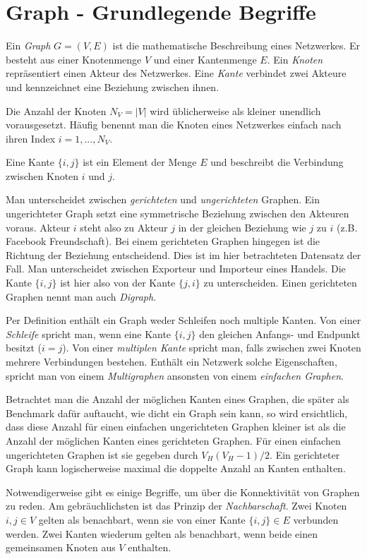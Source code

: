 \documentclass[a4paper,ngerman,oneside,titlepage,bibliography=totoc,11pt]{scrreprt}
\begin{document}
\section{Graph - Grundlegende Begriffe}

Ein \emph{Graph} $G = (V,E)$ ist die mathematische Beschreibung eines Netzwerkes. Er besteht aus einer Knotenmenge $V$ und einer Kantenmenge $E$. Ein \emph{Knoten} repräsentiert einen Akteur des Netzwerkes. Eine \emph{Kante} verbindet zwei Akteure und kennzeichnet eine Beziehung zwischen ihnen.

Die Anzahl der Knoten $N_V = |V|$ wird üblicherweise als kleiner unendlich vorausgesetzt. Häufig benennt man die Knoten eines Netzwerkes einfach nach ihren Index $i = 1, ..., N_V$.

Eine Kante $\{i,j\}$ ist ein Element der Menge $E$ und  beschreibt die Verbindung zwischen Knoten $i$ und $j$.

Man unterscheidet zwischen \emph{gerichteten} und \emph{ungerichteten} Graphen. Ein ungerichteter Graph setzt eine symmetrische Beziehung zwischen den Akteuren voraus. Akteur $i$ steht also zu Akteur $j$ in der gleichen Beziehung wie $j$ zu $i$ (z.B. Facebook Freundschaft). Bei einem gerichteten Graphen hingegen ist die Richtung der Beziehung entscheidend. Dies ist im hier betrachteten Datensatz der Fall. Man unterscheidet zwischen Exporteur und Importeur eines Handels. Die Kante $\{i,j\}$ ist hier also von der Kante $\{j,i\}$ zu unterscheiden. Einen gerichteten Graphen nennt man auch \emph{Digraph}.

Per Definition enthält ein Graph weder Schleifen noch multiple Kanten. Von einer \emph{Schleife} spricht man, wenn eine Kante $\{i,j\}$ den gleichen Anfangs- und Endpunkt besitzt ($i = j$). Von einer \emph{multiplen Kante} spricht man, falls zwischen zwei Knoten mehrere Verbindungen bestehen. Enthält ein Netzwerk solche Eigenschaften, spricht man von einem \emph{Multigraphen} ansonsten von einem \emph{einfachen Graphen}.

Betrachtet man die Anzahl der möglichen Kanten eines Graphen, die später als Benchmark dafür auftaucht, wie dicht ein Graph sein kann, so wird ersichtlich, dass diese Anzahl für einen einfachen ungerichteten Graphen kleiner ist als die Anzahl der möglichen Kanten eines gerichteten Graphen. Für einen einfachen ungerichteten Graphen ist sie gegeben durch $V_H(V_H-1)/2$. Ein gerichteter Graph kann logischerweise maximal die doppelte Anzahl an Kanten enthalten.

Notwendigerweise gibt es einige Begriffe, um über die Konnektivität von Graphen zu reden. Am gebräuchlichsten ist das Prinzip der \emph{Nachbarschaft}. Zwei Knoten $ i,j \in V$ gelten als benachbart, wenn sie von einer Kante $\{i,j\} \in E$ verbunden werden. Zwei Kanten wiederum gelten als benachbart, wenn beide einen gemeinsamen Knoten aus $V$ enthalten.
\end{document}
